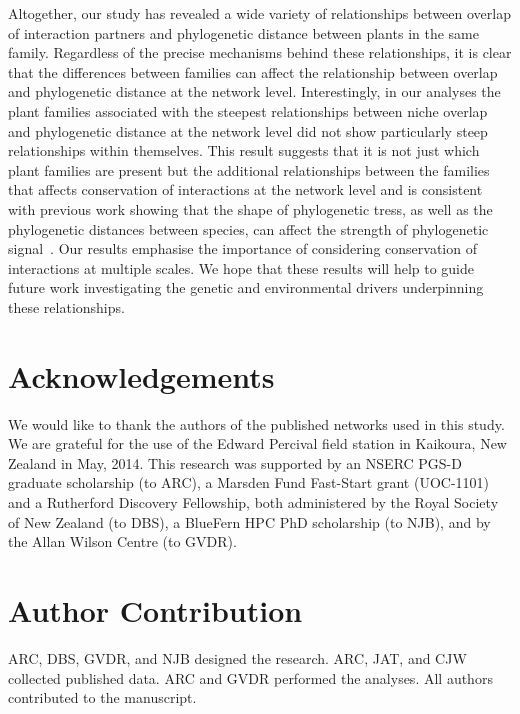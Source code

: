 \documentclass[12pt]{article}
\begin{document}
\begin{spacing}{1.5}
  Altogether, our study has revealed a wide variety of relationships 
  between overlap of interaction partners and phylogenetic distance 
  between plants in the same family. Regardless of the precise mechanisms
  behind these relationships, it is clear
  that the differences between families can affect the relationship
  between overlap and phylogenetic distance at the network level. 
  Interestingly, in our analyses the plant families associated with
  the steepest relationships between niche overlap and phylogenetic
  distance at the network level did not show particularly steep
  relationships within themselves. This result suggests
  that it is not just which plant families are present but the additional 
  relationships between the families that affects conservation of
  interactions at the network level and is consistent with previous
  work showing that the shape of phylogenetic tress, as well as the
  phylogenetic distances between species, can affect the strength
  of phylogenetic signal~\citep{Chamberlain2014a}. Our results 
  emphasise the importance of considering conservation of interactions at multiple scales.
  We hope that these results will help to guide future work investigating
  the genetic and environmental drivers underpinning these relationships.


\section*{Acknowledgements}

  We would like to thank the authors of the published networks used in this study. 
  We are grateful for the use of the Edward Percival field station in Kaikoura, 
  New Zealand in May, 2014. This research was supported by an NSERC PGS-D 
  graduate scholarship (to ARC), a Marsden Fund Fast-Start grant (UOC-1101) and a 
  Rutherford Discovery Fellowship, both administered by the Royal Society of New 
  Zealand (to DBS), a BlueFern HPC PhD scholarship (to NJB), and by
  the Allan Wilson Centre (to GVDR).


\section*{Author Contribution}

  ARC, DBS, GVDR, and NJB designed the research. ARC, JAT, and CJW collected published data.
  ARC and GVDR performed the analyses. All authors contributed to the manuscript.

\end{spacing}
\end{document}
